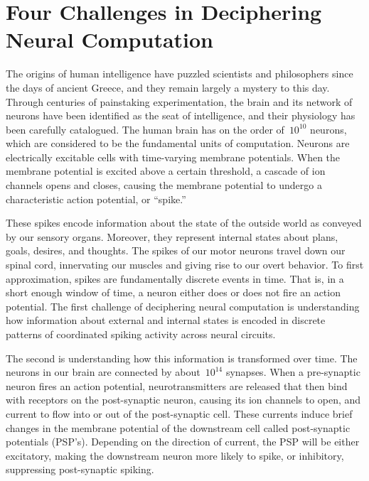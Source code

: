 \section{Four Challenges in Deciphering Neural Computation}
The origins of human intelligence have puzzled scientists and
philosophers since the days of ancient Greece, and they remain largely
a mystery to this day. Through centuries of painstaking
experimentation, the brain and its network of neurons have been
identified as the seat of intelligence, and their physiology has been
carefully catalogued. The human brain has on the order
of~$\text{10}^{\text{10}}$ neurons, which are considered to be the
fundamental units of computation. Neurons are electrically excitable
cells with time-varying membrane potentials. When the membrane
potential is excited above a certain threshold, a cascade of ion
channels opens and closes, causing the membrane potential to undergo a
characteristic action potential, or ``spike.''

These spikes encode information about the state of the outside world
as conveyed by our sensory organs. Moreover, they represent internal
states about plans, goals, desires, and thoughts. The spikes of our
motor neurons travel down our spinal cord, innervating our muscles and
giving rise to our overt behavior. To first approximation, spikes are
fundamentally discrete events in time.  That is, in a short enough
window of time, a neuron either does or does not fire an action
potential.  The first challenge of deciphering neural computation is
understanding how information about external and internal states is
encoded in discrete patterns of coordinated spiking activity across
neural circuits.

The second is understanding how this information is transformed over
time. The neurons in our brain are connected by
about~$\text{10}^{\text{14}}$ synapses. When a pre-synaptic neuron
fires an action potential, neurotransmitters are released that then
bind with receptors on the post-synaptic neuron, causing its ion
channels to open, and current to flow into or out of the post-synaptic
cell. These currents induce brief changes in the membrane potential of
the downstream cell called post-synaptic potentials (PSP's). Depending
on the direction of current, the PSP will be either excitatory, making
the downstream neuron more likely to spike, or inhibitory, suppressing
post-synaptic spiking.

